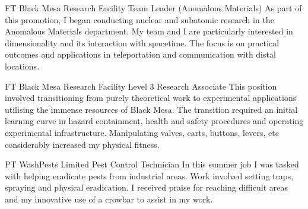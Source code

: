 \documentclass[10pt]{article} %
\begin{document}
\begin{paracol}{2}




{FT} %
{Black Mesa Research Facility} %
{Team Leader (Anomalous Materials)} %
{As part of this promotion, I began conducting nuclear and subatomic research in the Anomalous Materials department. My team and I are particularly interested in dimensionality and its interaction with spacetime. The focus is on practical outcomes and applications in teleportation and communication with distal locations.} %


{FT} %
{Black Mesa Research Facility} %
{Level 3 Research Associate} %
{This position involved transitioning from purely theoretical work to experimental applications utilising the immense resources of Black Mesa. The transition required an initial learning curve in hazard containment, health and safety procedures and operating experimental infrastructure. Manipulating valves, carts, buttons, levers, etc considerably increased my physical fitness.}  %


{PT} %
{WashPests Limited} %
{Pest Control Technician} %
{In this summer job I was tasked with helping eradicate pests from industrial areas. Work involved setting traps, spraying and physical eradication. I received praise for reaching difficult areas and my innovative use of a crowbar to assist in my work.} %


\vspace{-\baselineskip}\medskip %



\end{paracol}
\end{document}
